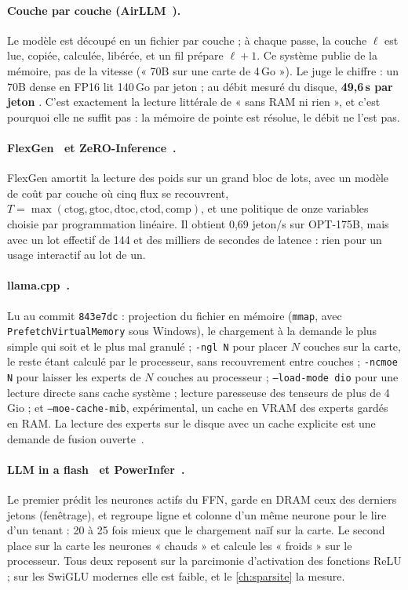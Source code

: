 \paragraph{Couche par couche (AirLLM~\cite{airllm2026}).} Le modèle est découpé en un fichier par couche ; à chaque passe, la couche $\ell$ est lue, copiée, calculée, libérée, et un fil prépare $\ell+1$. Ce système publie de la mémoire, pas de la vitesse (« 70B sur une carte de 4\,Go »). Le juge le chiffre : un 70B dense en FP16 lit 140\,Go par jeton ; au débit mesuré du disque, \textbf{49,6\,s par jeton} \calc. C'est exactement la lecture littérale de « sans RAM ni rien », et c'est pourquoi elle ne suffit pas : la mémoire de pointe est résolue, le débit ne l'est pas.

\paragraph{FlexGen~\cite{flexgen2023} et ZeRO-Inference~\cite{zeroinference2022}.} FlexGen amortit la lecture des poids sur un grand bloc de lots, avec un modèle de coût par couche où cinq flux se recouvrent, $T = \max(\text{ctog}, \text{gtoc}, \text{dtoc}, \text{ctod}, \text{comp})$, et une politique de onze variables choisie par programmation linéaire. Il obtient 0,69 jeton/s sur OPT-175B, mais avec un lot effectif de 144 et des milliers de secondes de latence \litt : rien pour un usage interactif au lot de un.

\paragraph{llama.cpp~\cite{llamacpp}.} Lu au commit \texttt{843e7dc} : projection du fichier en mémoire (\texttt{mmap}, avec \texttt{PrefetchVirtualMemory} sous Windows), le chargement à la demande le plus simple qui soit et le plus mal granulé ; \texttt{-ngl N} pour placer $N$ couches sur la carte, le reste étant calculé par le processeur, sans recouvrement entre couches ; \texttt{-ncmoe N} pour laisser les experts de $N$ couches au processeur ; \texttt{--load-mode dio} pour une lecture directe sans cache système ; lecture paresseuse des tenseurs de plus de 4\,Gio ; et \texttt{--moe-cache-mib}, expérimental, un cache en VRAM des experts gardés en RAM. La lecture des experts sur le disque avec un cache explicite est une demande de fusion ouverte~\cite{llamapr25294}.

\paragraph{LLM in a flash~\cite{llminflash2024} et PowerInfer~\cite{powerinfer2024,powerinfer2_2024}.} Le premier prédit les neurones actifs du FFN, garde en DRAM ceux des derniers jetons (fenêtrage), et regroupe ligne et colonne d'un même neurone pour le lire d'un tenant : 20 à 25 fois mieux que le chargement naïf sur la carte. Le second place sur la carte les neurones « chauds » et calcule les « froids » sur le processeur. Tous deux reposent sur la parcimonie d'activation des fonctions ReLU ; sur les SwiGLU modernes elle est faible, et le \cref{ch:sparsite} la mesure.

